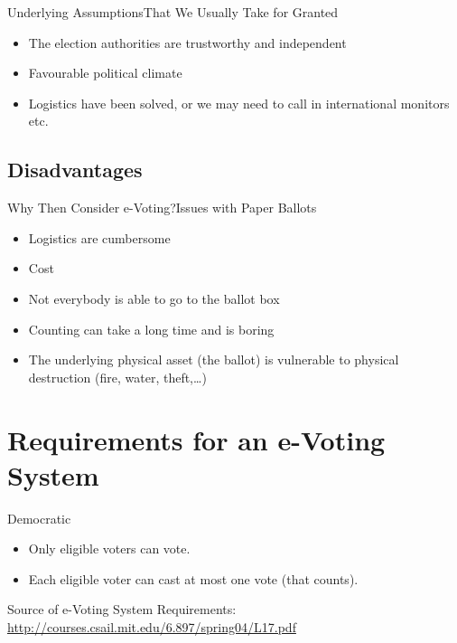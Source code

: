 \documentclass[utf8]{beamer}
\begin{document}
\begin{frame}{Underlying Assumptions}{That We Usually Take for Granted}

  \begin{itemize}
  \item<1->The election authorities are trustworthy and independent
  \item<2->Favourable political climate
  \item<3->Logistics have been solved,  or we may need to call in
    international monitors etc.
  \end{itemize}

\end{frame}

\subsection{Disadvantages}

\begin{frame}{Why Then Consider e-Voting?}{Issues with Paper Ballots}

  \begin{itemize}
  \item Logistics are cumbersome
  \item Cost
  \item Not everybody is able to go to the ballot box
  \item Counting can take a long time and is boring
  \item The underlying physical asset (the ballot) is vulnerable to
    physical destruction (fire, water, theft,\ldots)
  \end{itemize}

\end{frame}

\section{Requirements for an e-Voting System}

\begin{frame}{Democratic}

  \begin{itemize}
  \item Only eligible voters can vote.
  \item Each eligible voter can cast at most one vote (that counts).
  \end{itemize}

\vfill

Source of e-Voting System Requirements:
\url{http://courses.csail.mit.edu/6.897/spring04/L17.pdf}

\end{frame}
\end{document}
